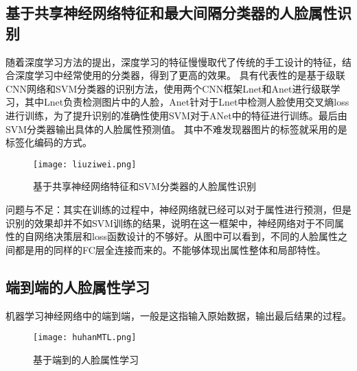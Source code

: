 \subsection{基于共享神经网络特征和最大间隔分类器的人脸属性识别}
随着深度学习方法的提出，深度学习的特征慢慢取代了传统的手工设计的特征，结合深度学习中经常使用的分类器，得到了更高的效果。
具有代表性的是基于级联CNN网络和SVM分类器的识别方法，使用两个CNN框架Lnet和Anet进行级联学习，其中Lnet负责检测图片中的人脸，Anet针对于Lnet中检测人脸使用交叉熵loss进行训练，为了提升识别的准确性使用SVM对于ANet中的特征进行训练。最后由SVM分类器输出具体的人脸属性预测值。
其中不难发现器图片的标签就采用的是标签化编码的方式。
\begin{figure}[!ht]
 \centering
	\texttt{[image: liuziwei.png]}
	\caption{基于共享神经网络特征和SVM分类器的人脸属性识别}
\end{figure}

问题与不足：其实在训练的过程中，神经网络就已经可以对于属性进行预测，但是识别的效果却并不如SVM训练的结果，说明在这一框架中，神经网络对于不同属性的自网络决策层和loss函数设计的不够好。从图中可以看到，不同的人脸属性之间都是用的同样的FC层全连接而来的。不能够体现出属性整体和局部特性。
 
\subsection{端到端的人脸属性学习}
机器学习神经网络中的端到端，一般是这指输入原始数据，输出最后结果的过程。




\begin{figure}[!ht]
 \centering
	\texttt{[image: huhanMTL.png]}
	\caption{基于端到的人脸属性学习}
\end{figure}
 


